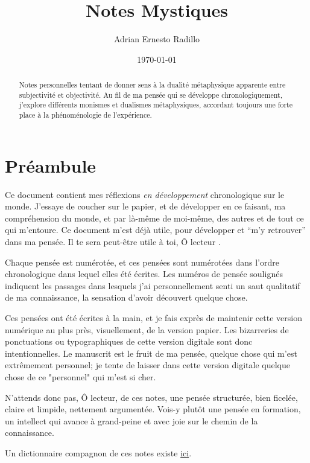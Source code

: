 \documentclass[11pt,a4paper]{article}
\title{\textbf{Notes Mystiques}}
\author{Adrian Ernesto Radillo}
\date{\today}
\begin{document}
\maketitle
\thispagestyle{fancy} 

\begin{abstract}
\noindent Notes personnelles tentant de donner sens à la dualité métaphysique apparente entre subjectivité et objectivité. Au fil de ma pensée qui se développe chronologiquement, j'explore différents monismes et dualismes métaphysiques, accordant toujours une forte place à la phénoménologie de l'expérience.
\end{abstract}

\vspace{2em}

\section*{Préambule}
\noindent Ce document contient mes réflexions \emph{en développement} chronologique sur le monde. J'essaye de coucher sur le papier, et de développer en ce faisant, ma compréhension du monde, et par là-même de moi-même, des autres et de tout ce qui m'entoure. Ce document m'est déjà utile, pour développer et ``m'y retrouver'' dans ma pensée. Il te sera peut-être utile à toi, Ô lecteur \smiley.

Chaque pensée est numérotée, et ces pensées sont numérotées dans l'ordre chronologique dans lequel elles été écrites. Les numéros de pensée soulignés indiquent les passages dans lesquels j'ai personnellement senti un saut qualitatif de ma connaissance, la sensation d'avoir découvert quelque chose.

Ces pensées ont été écrites à la main, et je fais exprès de maintenir cette version numérique au plus près, visuellement, de la version papier. Les bizarreries de ponctuations ou typographiques de cette version digitale sont donc intentionnelles. Le manuscrit est le fruit
de ma pensée, quelque chose qui m'est extrêmement personnel; je tente de laisser dans cette version digitale quelque chose de ce "personnel" qui m'est si cher.

N'attends donc pas, Ô lecteur, de ces notes, une pensée structurée, bien ficelée, claire et limpide, nettement argumentée. Vois-y plutôt une pensée en formation, un intellect qui avance à grand-peine et avec joie sur le chemin de la connaissance.

Un dictionnaire compagnon de ces notes existe \href{https://aernesto.github.io/metaphysical-wiki/}{ici}.
\end{document}
